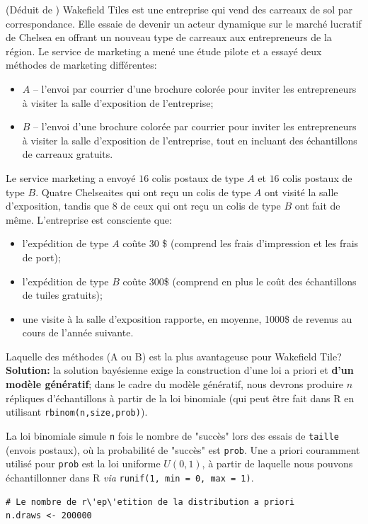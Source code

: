 \begin{Exemple} (D\'eduit de \cite{BDA_N13}) 
Wakefield Tiles est une entreprise qui vend des carreaux de sol par correspondance. Elle essaie de devenir un acteur dynamique sur le march\'e lucratif de Chelsea en offrant un nouveau type de carreaux aux entrepreneurs de la r\'egion. Le service de marketing a men\'e une \'etude pilote et a essay\'e deux m\'ethodes de marketing diff\'erentes:
\begin{itemize}[noitemsep]
	\item $A$ -- l'envoi par courrier d'une brochure color\'ee pour inviter les entrepreneurs \`a visiter la salle d'exposition de l'entreprise;
	\item $B$ -- l'envoi d'une brochure color\'ee par courrier pour inviter les entrepreneurs \`a visiter la salle d'exposition de l'entreprise, tout en incluant des \'echantillons de carreaux gratuits.
\end{itemize}
Le service marketing a envoy\'e $16$ colis postaux de type $A$ et $16$ colis postaux de type $B$. Quatre Chelseaites qui ont reçu un colis de type $A$ ont visit\'e la salle d'exposition, tandis que $8$ de ceux qui ont reçu un colis de type $B$ ont fait de même. L'entreprise est consciente que:
\begin{itemize}[noitemsep]
\item l'exp\'edition de type $A$ coûte 30 \$ (comprend les frais d'impression et les frais de port);
\item l'exp\'edition de type $B$ coûte 300\$ (comprend en plus le coût des \'echantillons de tuiles gratuits);
\item une visite \`a la salle d'exposition rapporte, en moyenne, 1000\$ de revenus au cours de l'ann\'ee suivante.
\end{itemize}
Laquelle des m\'ethodes (A ou B) est la plus avantageuse pour Wakefield Tile? \newl
\textbf{Solution:} la solution bay\'esienne exige la construction d'une loi a priori et \textbf{d'un mod\`ele g\'en\'eratif}; dans le cadre du mod\`ele g\'en\'eratif, nous devrons produire $n$ r\'epliques d'\'echantillons \`a partir de la loi binomiale (qui peut être fait dans R en utilisant \texttt{rbinom(n,size,prob)}). \par La loi binomiale simule \texttt{n} fois le nombre de "succ\`es" lors des essais de \texttt{taille} (envois postaux), où la probabilit\'e de "succ\`es" est \texttt{prob}.  Une a priori couramment utilis\'e pour \texttt{prob} est la loi uniforme $U(0,1)$, \`a partir de laquelle nous pouvons \'echantillonner dans R \textit{via} \texttt{runif(1, min = 0, max = 1)}.  
\begin{lstlisting}
# Le nombre de r\'ep\'etition de la distribution a priori
n.draws <- 200000


\end{lstlisting}
\end{Exemple}
